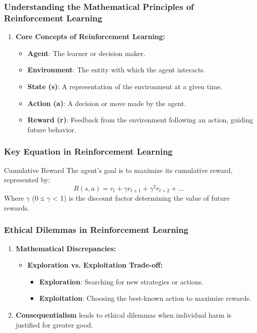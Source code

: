 \documentclass[aspectratio=169]{beamer}
\begin{document}
\begin{frame}[fragile]
    \frametitle{Understanding the Mathematical Principles of Reinforcement Learning}
    \begin{enumerate}
        \item \textbf{Core Concepts of Reinforcement Learning:}
        \begin{itemize}
            \item \textbf{Agent}: The learner or decision maker.
            \item \textbf{Environment}: The entity with which the agent interacts.
            \item \textbf{State (s)}: A representation of the environment at a given time.
            \item \textbf{Action (a)}: A decision or move made by the agent.
            \item \textbf{Reward (r)}: Feedback from the environment following an action, guiding future behavior.
        \end{itemize}
    \end{enumerate}
\end{frame}

\begin{frame}[fragile]
    \frametitle{Key Equation in Reinforcement Learning}
    \begin{block}{Cumulative Reward}
        The agent's goal is to maximize its cumulative reward, represented by:
        \begin{equation}
            R(s, a) = r_t + \gamma r_{t+1} + \gamma^2 r_{t+2} + \ldots
        \end{equation}
        Where $\gamma$ (0 ≤ $\gamma$ < 1) is the discount factor determining the value of future rewards.
    \end{block}
\end{frame}

\begin{frame}[fragile]
    \frametitle{Ethical Dilemmas in Reinforcement Learning}
    \begin{enumerate}
        \item \textbf{Mathematical Discrepancies:}
        \begin{itemize}
            \item \textbf{Exploration vs. Exploitation Trade-off:} 
            \begin{itemize}
                \item \textbf{Exploration}: Searching for new strategies or actions.
                \item \textbf{Exploitation}: Choosing the best-known action to maximize rewards.
            \end{itemize}
        \end{itemize}
        \item \textbf{Consequentialism} leads to ethical dilemmas when individual harm is justified for greater good.
    \end{enumerate}
\end{frame}
\end{document}
